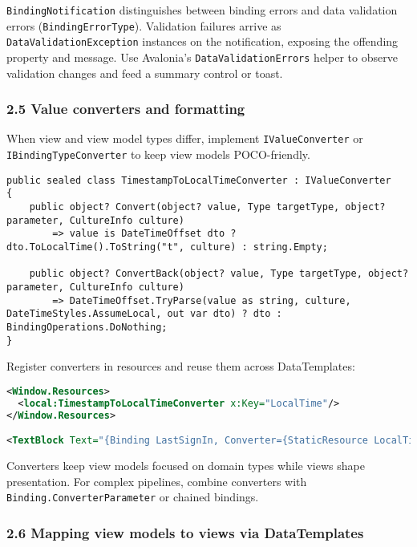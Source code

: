 \passthrough{\lstinline!BindingNotification!} distinguishes between
binding errors and data validation errors
(\passthrough{\lstinline!BindingErrorType!}). Validation failures arrive
as \passthrough{\lstinline!DataValidationException!} instances on the
notification, exposing the offending property and message. Use
Avalonia's \passthrough{\lstinline!DataValidationErrors!} helper to
observe validation changes and feed a summary control or toast.

\subsubsection{2.5 Value converters and
formatting}\label{value-converters-and-formatting}

When view and view model types differ, implement
\passthrough{\lstinline!IValueConverter!} or
\passthrough{\lstinline!IBindingTypeConverter!} to keep view models
POCO-friendly.

\begin{lstlisting}
public sealed class TimestampToLocalTimeConverter : IValueConverter
{
    public object? Convert(object? value, Type targetType, object? parameter, CultureInfo culture)
        => value is DateTimeOffset dto ? dto.ToLocalTime().ToString("t", culture) : string.Empty;

    public object? ConvertBack(object? value, Type targetType, object? parameter, CultureInfo culture)
        => DateTimeOffset.TryParse(value as string, culture, DateTimeStyles.AssumeLocal, out var dto) ? dto : BindingOperations.DoNothing;
}
\end{lstlisting}

Register converters in resources and reuse them across DataTemplates:

\begin{lstlisting}[language=XML]
<Window.Resources>
  <local:TimestampToLocalTimeConverter x:Key="LocalTime"/>
</Window.Resources>

<TextBlock Text="{Binding LastSignIn, Converter={StaticResource LocalTime}}"/>
\end{lstlisting}

Converters keep view models focused on domain types while views shape
presentation. For complex pipelines, combine converters with
\passthrough{\lstinline!Binding.ConverterParameter!} or chained
bindings.

\subsubsection{2.6 Mapping view models to views via
DataTemplates}\label{mapping-view-models-to-views-via-datatemplates}


